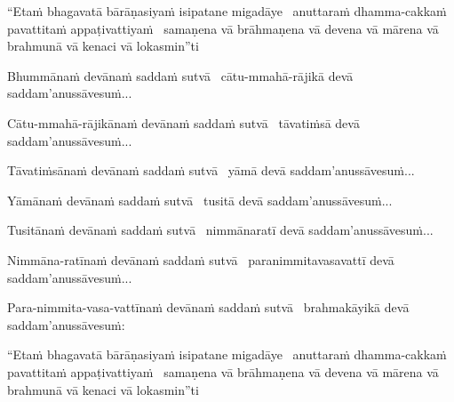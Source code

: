 \ifninebythirteen\clearpage\fi
\ifafive\clearpage\fi

\begin{pali-hang}
  ``Etaṁ bhagavatā bārāṇasiyaṁ isipatane migadāye \breathmark\ anuttaraṁ dhamma-cakkaṁ pavattitaṁ appaṭivattiyaṁ \breathmark\ samaṇena vā brāhmaṇena vā devena vā mārena vā brahmunā vā kenaci vā lokasmin''ti
\end{pali-hang}

\begin{pali-hang}
  Bhummānaṁ devānaṁ saddaṁ sutvā \breathmark\  cātu-mmahā-rājikā devā saddam'anussāvesuṁ...
\end{pali-hang}

\begin{pali-hang}
  Cātu-mmahā-rājikānaṁ devānaṁ saddaṁ sutvā \breathmark\  tāvatiṁsā devā saddam'anussāvesuṁ...
\end{pali-hang}

\begin{pali-hang}
  Tāvatiṁsānaṁ devānaṁ saddaṁ sutvā \breathmark\  yāmā devā saddam'anussāvesuṁ...
\end{pali-hang}

\begin{pali-hang}
  Yāmānaṁ devānaṁ saddaṁ sutvā \breathmark\  tusitā devā saddam'anussāvesuṁ...
\end{pali-hang}

\begin{pali-hang}
  Tusitānaṁ devānaṁ saddaṁ sutvā \breathmark\  nimmānaratī devā saddam'anussāvesuṁ...
\end{pali-hang}

\begin{pali-hang}
  Nimmāna-ratīnaṁ devānaṁ saddaṁ sutvā \breathmark\  paranimmitavasavattī devā saddam'anussāvesuṁ...
\end{pali-hang}

\begin{pali-hang}
  Para-nimmita-vasa-vattīnaṁ devānaṁ saddaṁ sutvā \breathmark\  brahmakāyikā devā saddam'anussāvesuṁ:
\end{pali-hang}

\ifninebythirteen\clearpage\fi

\begin{pali-hang}
  ``Etaṁ bhagavatā bārāṇasiyaṁ isipatane migadāye \breathmark\ anuttaraṁ dhamma-cakkaṁ pavattitaṁ appaṭivattiyaṁ \breathmark\ samaṇena vā brāhmaṇena vā devena vā mārena vā brahmunā vā kenaci vā lokasmin''ti
\end{pali-hang}

